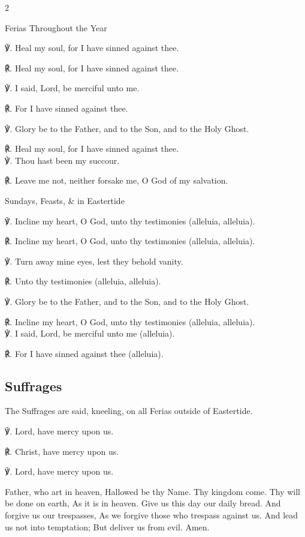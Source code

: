 \begin{multicols}{2}
\begin{inhead}
	Ferias Throughout the Year
\end{inhead}
℣. Heal my soul, for I have sinned against thee.

℟. Heal my soul, for I have sinned against thee.

℣. I said, Lord, be merciful unto me.

℟. For I have sinned against thee.

℣. Glory be to the Father, and to the Son, and to the Holy Ghost.

℟. Heal my soul, for I have sinned against thee.\\

℣. Thou hast been my succour.

℟. Leave me not, neither forsake me, O God of my salvation.

\begin{inhead}
	Sundays, Feasts, \& in Eastertide
\end{inhead}

℣. Incline my heart, O God, unto thy testimonies (alleluia, alleluia).

℟. Incline my heart, O God, unto thy testimonies (alleluia, alleluia).

℣. Turn away mine eyes, lest they behold vanity.

℟. Unto thy testimonies (alleluia, alleluia).

℣. Glory be to the Father, and to the Son, and to the Holy Ghost.

℟. Incline my heart, O God, unto thy testimonies (alleluia, alleluia).\\

℣. I said, Lord, be merciful unto me (alleluia).

℟. For I have sinned against thee (alleluia).

\subsection{Suffrages}

\begin{rubric}
	The Suffrages are said, kneeling, on all Ferias outside of Eastertide.
\end{rubric}

℣. Lord, have mercy upon us.

℟. Christ, have mercy upon us.

℣. Lord, have mercy upon us.

 Father, who art in heaven, Hallowed be thy Name. Thy kingdom come. Thy will be done on earth, As it is in heaven. Give us this day our daily bread. And forgive us our trespasses, As we forgive those who trespass against us. And lead us not into temptation; But deliver us from evil. Amen.


\end{multicols}
